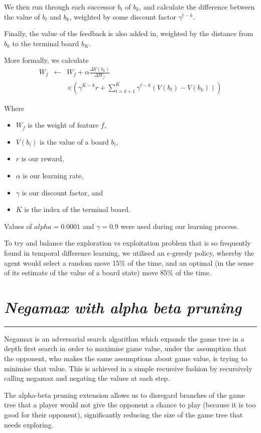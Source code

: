 \documentclass[10pt]{report}
\begin{document}
\begin{multicols}{2}
We then run through each successor $b_t$ of $b_k$, and calculate the difference between the value of $b_t$ and $b_k$, weighted by some discount factor $\gamma^{t-k}$.

Finally, the value of the feedback is also added in, weighted by the distance from $b_k$ to the terminal board $b_K$.

More formally, we calculate 
\begin{eqnarray}
	W_f  & \leftarrow & W_f + \alpha \frac{\Delta V(b_k)}{\Delta W_f} \nonumber  \\
	&&  \times \left(\gamma^{K-k}r + \sum_{t=k+1}^K \gamma^{t-k}\left(V(b_t) - V(b_k)\right)\right) \nonumber
\end{eqnarray}

Where
   \begin{itemize}
  \item
  	$W_f$ is the weight of feature $f$,
  \item
	$V(b_i)$ is the value of a board $b_i$,
  \item
	$r$ is our reward,
 \item
	$\alpha$ is our learning rate,
  \item
	$\gamma$ is our discount factor, and
  \item
	$K$ is the index of the terminal board.
  \end{itemize}

Values of $alpha = 0.0001$ and $\gamma = 0.9$ were used during our learning process.

To try and balance the exploration vs exploitation problem that is so frequently found in temporal difference learning, we utilised an $\epsilon$-greedy policy, whereby the agent would select a random move 15\% of the time, and an optimal (in the sense of its estimate of the value of a board state) move 85\% of the time.

\section*{\emph{Negamax with alpha beta pruning}}
\hrule

Negamax is an adversarial search algorithm which expands the game tree in a depth first search in order to maximise game value, under the assumption that the opponent, who makes the same assumptions about game value, is trying to minimise that value. This is achieved in a simple recursive fashion by recursively calling negamax and negating the values at each step.

The alpha-beta pruning extension allows us to disregard branches of the game tree that a player would not give the opponent a chance to play (because it is too good for their opponent), significantly reducing the size of the game tree that needs exploring.


\end{multicols}
\end{document}
